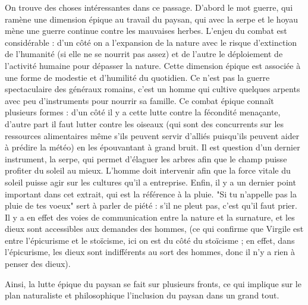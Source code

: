 \documentclass[a4paper,12pt]{book}
\begin{document}
\par On trouve des choses intéressantes dans ce passage. D'abord le mot guerre, qui ramène une dimension épique au travail du paysan, qui avec la serpe et le hoyau mène une guerre continue contre les mauvaises herbes. L'enjeu du combat est considérable : d'un côté on a l'expansion de la nature avec le risque d'extinction de l'humanité (si elle ne se nourrit pas assez) et de l'autre le déploiement de l'activité humaine pour dépasser la nature. Cette dimension épique est associée à une forme de modestie et d'humilité du quotidien. Ce n'est pas la guerre spectaculaire des généraux romains, c'est un homme qui cultive quelques arpents avec peu d'instruments pour nourrir sa famille. Ce combat épique connaît plusieurs formes : d'un côté il y a cette lutte contre la fécondité menaçante, d'autre part il faut lutter contre les oiseaux (qui sont des concurrents sur les ressources alimentaires même s'ils peuvent servir d'alliés puisqu'ils peuvent aider à prédire la météo) en les épouvantant à grand bruit. Il est question d'un dernier instrument, la serpe, qui permet d'élaguer les arbres afin que le champ puisse profiter du soleil au mieux. L'homme doit intervenir afin que la force vitale du soleil puisse agir sur les cultures qu'il a entreprise. Enfin, il y a un dernier point important dans cet extrait, qui est la référence à la pluie. "Si tu n'appelle pas la pluie de tes voeux" sert à parler de piété : s'il ne pleut pas, c'est qu'il faut prier. Il y a en effet des voies de communication entre la nature et la surnature, et les dieux sont accessibles aux demandes des hommes, (ce qui confirme que Virgile est entre l'épicurisme et le stoïcisme, ici on est du côté du stoïcisme ; en effet, dans l'épicurisme, les dieux sont indifférents au sort des hommes, donc il n'y a rien à penser des dieux).
\par Ainsi, la lutte épique du paysan se fait sur plusieurs fronts, ce qui implique sur le plan naturaliste et philosophique l'inclusion du paysan dans un grand tout.
\end{document}
